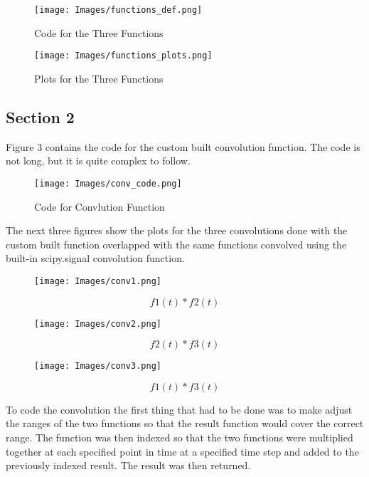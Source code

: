 \documentclass{article}
\begin{document}
\begin{figure}[h]
\centering
\texttt{[image: Images/functions\_def.png]}
\caption{Code for the Three Functions}
\label{fig:Code for the Three Functions}
\end{figure}

\begin{figure}[h]
\centering
\texttt{[image: Images/functions\_plots.png]}
\caption{Plots for the Three Functions}
\label{fig:Plots for the Three Functions}
\end{figure}

\newpage

\subsection*{Section 2}
Figure 3 contains the code for the custom built convolution function. The code is not long, but it is quite complex to follow.

\begin{figure}[h]
\centering
\texttt{[image: Images/conv\_code.png]}
\caption{Code for Convlution Function}
\label{fig:Code for Convlution Function}
\end{figure}

The next three figures show the plots for the three convolutions done with the custom built function overlapped with the same functions convolved using the built-in scipy.signal convolution function. 

\begin{figure}[!]
\centering
\texttt{[image: Images/conv1.png]}
\caption{$$f1(t)*f2(t)$$}
\label{fig:$$f1(t)*f2(t)$$}
\end{figure}

\begin{figure}[!]
\centering
\texttt{[image: Images/conv2.png]}
\caption{$$f2(t)*f3(t)$$}
\label{fig:$$f2(t)*f3(t)$$}
\end{figure}

\begin{figure}[!]
\centering
\texttt{[image: Images/conv3.png]}
\caption{$$f1(t)*f3(t)$$}
\label{fig:$$f1(t)*f2(t)$$}
\end{figure}

\newpage

To code the convolution the first thing that had to be done was to make adjust the ranges of the two functions so that the result function would cover the correct range. The function was then indexed so that the two functions were multiplied together at each specified point in time at a specified time step and added to the previously indexed result. The result was then returned.
\end{document}
